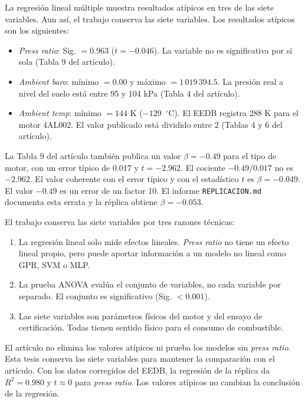 La regresión lineal múltiple muestra resultados atípicos en tres de las siete variables. Aun así, el trabajo conserva las siete variables. Los resultados atípicos son los siguientes:

\begin{itemize}
    \item \textit{Press ratio}: Sig. $= 0.963$ ($t = -0.046$). La variable no es significativa por sí sola (Tabla 9 del artículo).
    \item \textit{Ambient baro}: mínimo $= 0.00$ y máximo $= 1\,019\,394.5$. La presión real a nivel del suelo está entre 95 y 104 kPa (Tabla 4 del artículo).
    \item \textit{Ambient temp}: mínimo $= 144$ K ($-129$~$^{\circ}$C). El EEDB registra 288 K para el motor 4AL002. El valor publicado está dividido entre 2 (Tablas 4 y 6 del artículo).
\end{itemize}

La Tabla 9 del artículo también publica un valor $\beta = -0.49$ para el tipo de motor, con un error típico de 0.017 y $t = -2.962$. El cociente $-0.49/0.017$ no es $-2.962$. El valor coherente con el error típico y con el estadístico $t$ es $\beta = -0.049$. El valor $-0.49$ es un error de un factor 10. El informe \texttt{REPLICACION.md} documenta esta errata y la réplica obtiene $\beta = -0.053$.

El trabajo conserva las siete variables por tres razones técnicas:

\begin{enumerate}
    \item La regresión lineal solo mide efectos lineales. \textit{Press ratio} no tiene un efecto lineal propio, pero puede aportar información a un modelo no lineal como GPR, SVM o MLP.
    \item La prueba ANOVA evalúa el conjunto de variables, no cada variable por separado. El conjunto es significativo (Sig. $< 0.001$).
    \item Las siete variables son parámetros físicos del motor y del ensayo de certificación. Todas tienen sentido físico para el consumo de combustible.
\end{enumerate}

El artículo no elimina los valores atípicos ni prueba los modelos sin \textit{press ratio}. Esta tesis conserva las siete variables para mantener la comparación con el artículo. Con los datos corregidos del EEDB, la regresión de la réplica da $R^2 = 0.980$ y $t \approx 0$ para \textit{press ratio}. Los valores atípicos no cambian la conclusión de la regresión.

